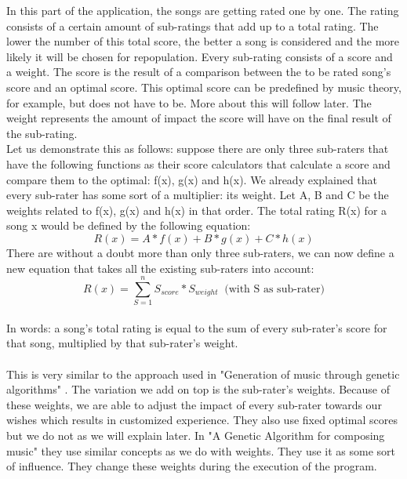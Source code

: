 \documentclass[a4paper]{article}
\begin{document}
In this part of the application, the songs are getting rated one by one. The rating consists of a certain amount of sub-ratings that add up to a total rating. The lower the number of this total score, the better a song is considered and the more likely it will be chosen for repopulation. Every sub-rating consists of a score and a weight. The score is the result of a comparison between the to be rated song's score and an optimal score. This optimal score can be predefined by music theory, for example, but does not have to be. More about this will follow later. The weight represents the amount of impact the score will have on the final result of the sub-rating. 
\\
Let us demonstrate this as follows: suppose there are only three sub-raters that have the following functions as their score calculators that calculate a score and compare them to the optimal: f(x), g(x) and h(x). We already explained that every sub-rater has some sort of a multiplier: its weight. Let A, B and C be the weights related to f(x), g(x) and h(x) in that order. The total rating R(x) for a song x would be defined by the following equation:  \[ R(x) =  A * f(x) + B * g(x)  +  C * h(x)  \]
There are without a doubt more than only three sub-raters, we can now define a new equation that takes all the existing sub-raters into account: 
\[ R(x) = \sum_{S=1}^{n} S_{score} * S_{weight} \   \text{  (with S as sub-rater)}\] 
\\
In words: a song's total rating is equal to the sum of every sub-rater's score for that song, multiplied by that sub-rater's weight.
\\\\
This is very similar to the approach used in "Generation of music through genetic algorithms" \cite{genmusicbach}. The variation we add on top is the sub-rater's weights. Because of these weights, we are able to adjust the impact of every sub-rater towards our wishes which results in customized experience. They also use fixed optimal scores but we do not as we will explain later. In "A Genetic Algorithm for composing music" \cite{genetic} they use similar concepts as we do with weights. They use it as some sort of influence. They change these weights during the execution of the program.
\end{document}
